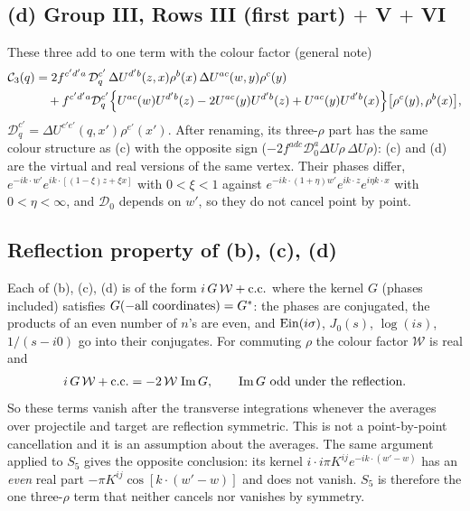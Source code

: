 \documentclass[10pt]{article}
\numberwithin{equation}{section}
\begin{document}
\subsection{(d) Group III, Rows III (first part) $+$ V $+$ VI}
These three add to one term with the colour factor (general note)
\begin{align}
\mathcal{C}_{3}(q)&=2f^{c'd'a}\,\mathcal{D}^{c'}_{q}\,\Delta U^{d'b}(z,x)\rho^{b}(x)\,\Delta U^{ac}(w,y)\rho^{c}(y)\notag\\
&\quad+f^{c'd'a}\mathcal{D}^{c'}_{q}\Big\{U^{ac}(w)U^{d'b}(z)-2U^{ac}(y)U^{d'b}(z)+U^{ac}(y)U^{d'b}(x)\Big\}\big[\rho^{c}(y),\rho^{b}(x)\big],
\end{align}
$\mathcal{D}^{c'}_{q}=\Delta U^{c'e'}(q,x')\rho^{e'}(x')$. After renaming, its three-$\rho$ part has the same colour structure as (c) with the opposite sign ($-2f^{adc}\mathcal{D}_{0}^{a}\Delta U\rho\,\Delta U\rho$): (c) and (d) are the virtual and real versions of the same vertex. Their phases differ, $e^{-ik\cdot w'}e^{ik\cdot[(1-\xi)z+\xi x]}$ with $0<\xi<1$ against $e^{-ik\cdot(1+\eta)w'}e^{ik\cdot z}e^{i\eta k\cdot x}$ with $0<\eta<\infty$, and $\mathcal{D}_{0}$ depends on $w'$, so they do not cancel point by point.

\subsection{Reflection property of (b), (c), (d)}\label{sec:refl}
Each of (b), (c), (d) is of the form $i\,G\,\mathcal{W}+{\rm c.c.}$ where the kernel $G$ (phases included) satisfies $G(-{\rm all\ coordinates})=G^{*}$: the phases are conjugated, the products of an even number of $n$'s are even, and ${\rm Ein}(i\sigma)$, $J_{0}(s)$, $\log(is)$, $1/(s-i0)$ go into their conjugates. For commuting $\rho$ the colour factor $\mathcal{W}$ is real and
\begin{align}
i\,G\,\mathcal{W}+{\rm c.c.}=-2\,\mathcal{W}\;{\rm Im}\,G,\qquad{\rm Im}\,G\ \text{odd under the reflection}.
\end{align}
So these terms vanish after the transverse integrations whenever the averages over projectile and target are reflection symmetric. This is not a point-by-point cancellation and it is an assumption about the averages. The same argument applied to $S_{5}$ gives the opposite conclusion: its kernel $i\cdot i\pi K^{ij}e^{-ik\cdot(w'-w)}$ has an \emph{even} real part $-\pi K^{ij}\cos[k\cdot(w'-w)]$ and does not vanish. $S_{5}$ is therefore the one three-$\rho$ term that neither cancels nor vanishes by symmetry.
\end{document}
